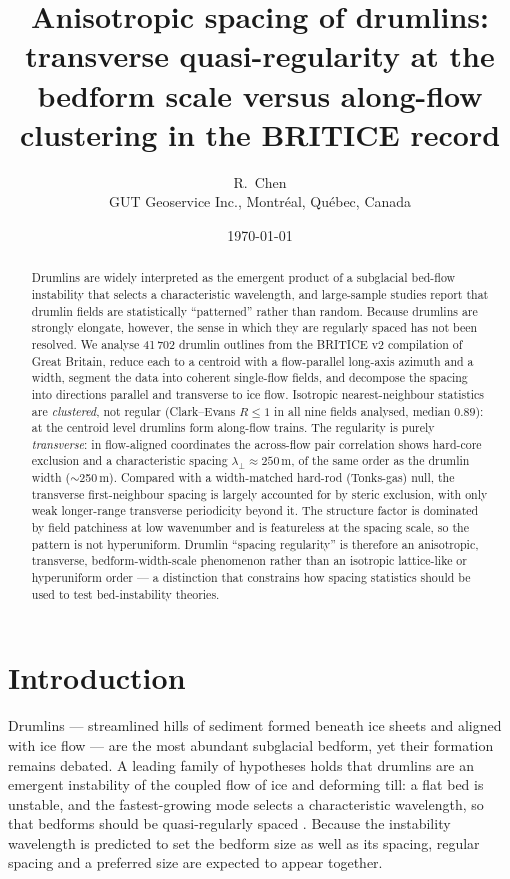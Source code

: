 \documentclass[11pt]{article}
\title{\bfseries Anisotropic spacing of drumlins: transverse quasi-regularity at the
bedform scale versus along-flow clustering in the BRITICE record}
\author{R.~Chen\\{\small GUT Geoservice Inc., Montr\'eal, Qu\'ebec, Canada}}
\date{\today}
\begin{document}
\maketitle

\begin{abstract}
\noindent
Drumlins are widely interpreted as the emergent product of a subglacial bed-flow instability that
selects a characteristic wavelength, and large-sample studies report that drumlin fields are
statistically ``patterned'' rather than random. Because drumlins are strongly elongate, however, the
sense in which they are regularly spaced has not been resolved. We analyse 41\,702 drumlin outlines
from the BRITICE v2 compilation of Great Britain, reduce each to a centroid with a flow-parallel
long-axis azimuth and a width, segment the data into coherent single-flow fields, and decompose the
spacing into directions parallel and transverse to ice flow. Isotropic nearest-neighbour statistics
are \emph{clustered}, not regular (Clark--Evans $R\le1$ in all nine fields analysed, median $0.89$):
at the centroid level drumlins form along-flow trains. The regularity is purely \emph{transverse}: in
flow-aligned coordinates the across-flow pair correlation shows hard-core exclusion and a characteristic
spacing $\lambda_\perp\!\approx\!250$\,m, of the same order as the drumlin width ($\sim$250\,m). Compared
with a width-matched hard-rod (Tonks-gas) null, the transverse first-neighbour spacing is largely accounted
for by steric exclusion, with only weak longer-range transverse periodicity beyond it. The structure
factor is dominated by field patchiness at low wavenumber and is featureless at the spacing scale, so the
pattern is not hyperuniform. Drumlin ``spacing regularity'' is therefore an anisotropic, transverse,
bedform-width-scale phenomenon rather than an isotropic lattice-like or hyperuniform order --- a
distinction that constrains how spacing statistics should be used to test bed-instability theories.
\end{abstract}

\section{Introduction}
Drumlins --- streamlined hills of sediment formed beneath ice sheets and aligned with ice flow --- are
the most abundant subglacial bedform, yet their formation remains debated. A leading family of
hypotheses holds that drumlins are an emergent instability of the coupled flow of ice and deforming
till: a flat bed is unstable, and the fastest-growing mode selects a characteristic wavelength, so that
bedforms should be quasi-regularly spaced \citep{hindmarsh1998,fowler2000,fowler2014}. Because the
instability wavelength is predicted to set the bedform size as well as its spacing, regular spacing and a
preferred size are expected to appear together.
\end{document}
